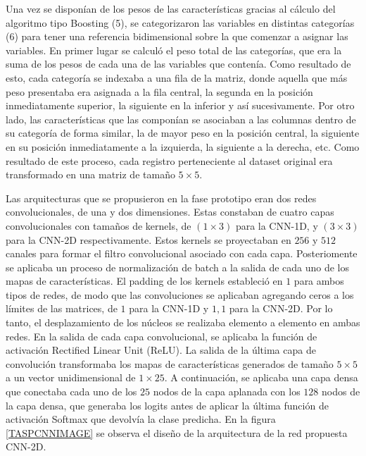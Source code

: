 Una vez se disponían de los pesos de las características gracias al cálculo del algoritmo tipo Boosting (5), se categorizaron las variables en distintas categorías (6) para tener una referencia bidimensional sobre la que comenzar a asignar las variables. En primer lugar se calculó el peso total de las categorías, que era la suma de los pesos de cada una de las variables que contenía. Como resultado de esto, cada categoría se indexaba a una fila de la matriz, donde aquella que más peso presentaba era asignada a la fila central, la segunda en la posición inmediatamente superior, la siguiente en la inferior y así sucesivamente. Por otro lado, las características que las componían se asociaban a las columnas dentro de su categoría de forma similar, la de mayor peso en la posición central, la siguiente en su posición inmediatamente a la izquierda, la siguiente a la derecha, etc. Como resultado de este proceso, cada registro perteneciente al dataset original era transformado en una matriz de tamaño $5\times5$.

Las arquitecturas que se propusieron en la fase prototipo eran dos redes convolucionales, de una y dos dimensiones. Estas constaban de cuatro capas convolucionales con tamaños de kernels, de $(1 \times 3)$ para la CNN-1D, y $(3 \times 3)$ para la CNN-2D respectivamente. Estos kernels se proyectaban en $256$ y $512$ canales para formar el filtro convolucional asociado con cada capa. Posteriomente se aplicaba un proceso de normalización de batch a la salida de cada uno de los mapas de características. El padding de los kernels estableció en $1$ para ambos tipos de redes, de modo que las convoluciones se aplicaban agregando ceros a los límites de las matrices, de $1$ para la CNN-1D y ${1, 1}$ para la CNN-2D. Por lo tanto, el desplazamiento de los núcleos se realizaba elemento a elemento en ambas redes. En la salida de cada capa convolucional, se aplicaba la función de activación Rectified Linear Unit  (ReLU). La salida de la última capa de convolución transformaba los mapas de características generados de tamaño $5 \times 5$ a un vector unidimensional de $1 \times 25$. A continuación, se aplicaba una capa densa que conectaba cada uno de los $25$ nodos de la capa aplanada con los $128$ nodos de la capa densa, que generaba los logits antes de aplicar la última función de activación Softmax que devolvía la clase predicha. En la figura \ref{TASPCNNIMAGE} se observa el diseño de la arquitectura de la red propuesta CNN-2D.

